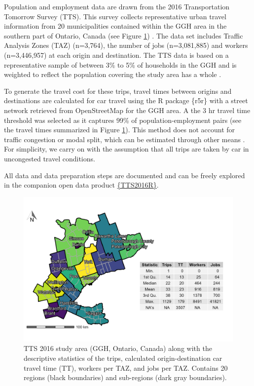 \documentclass[]{elsarticle} %
\begin{document}
Population and employment data are drawn from the 2016 Transportation
Tomorrow Survey (TTS). This survey collects representative urban travel
information from 20 municipalities contained within the GGH area in the
southern part of Ontario, Canada (see Figure
\ref{fig:TTS-16-survey-area}) \citep{data_management_group_tts_2018}.
The data set includes Traffic Analysis Zones (TAZ) (n=3,764), the number
of jobs (n=3,081,885) and workers (n=3,446,957) at each origin and
destination. The TTS data is based on a representative sample of between
3\% to 5\% of households in the GGH and is weighted to reflect the
population covering the study area has a whole
\citep{data_management_group_tts_2018}.

To generate the travel cost for these trips, travel times between
origins and destinations are calculated for car travel using the R
package \{r5r\} \citep{r5r_2021} with a street network retrieved from
OpenStreetMap for the GGH area. A the 3 hr travel time threshold was
selected as it captures 99\% of population-employment pairs (see the
travel times summarized in Figure \ref{fig:TTS-16-survey-area}). This
method does not account for traffic congestion or modal split, which can
be estimated through other means
\citep[e.g.,][]{allen_suburbanization_2021, higgins2021changes}. For
simplicity, we carry on with the assumption that all trips are taken by
car in uncongested travel conditions.

All data and data preparation steps are documented and can be freely
explored in the companion open data product
\href{https://github.com/soukhova/TTS2016R}{\{TTS2016R\}}.

\begin{figure}

{\centering \includegraphics[width=0.8\linewidth]{images/TTS16-survey-area} 

}

\caption{\label{fig:TTS-16-survey-area}TTS 2016 study area (GGH, Ontario, Canada) along with the descriptive statistics of the trips, calculated origin-destination car travel time (TT), workers per TAZ, and jobs per TAZ. Contains 20 regions (black boundaries) and sub-regions (dark gray boundaries).}\label{fig:TTS-16-survey-area}
\end{figure}
\end{document}
